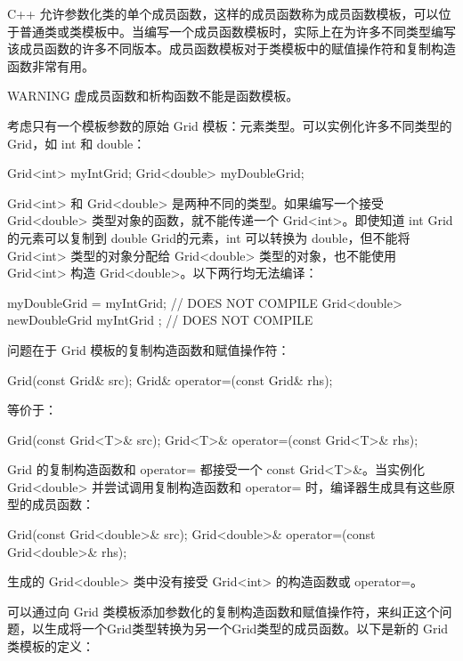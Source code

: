 
C++ 允许参数化类的单个成员函数，这样的成员函数称为成员函数模板，可以位于普通类或类模板中。当编写一个成员函数模板时，实际上在为许多不同类型编写该成员函数的许多不同版本。成员函数模板对于类模板中的赋值操作符和复制构造函数非常有用。

\begin{myWarning}{WARNING}
虚成员函数和析构函数不能是函数模板。
\end{myWarning}

考虑只有一个模板参数的原始 Grid 模板：元素类型。可以实例化许多不同类型的Grid，如 int 和 double：

\begin{cpp}
Grid<int> myIntGrid;
Grid<double> myDoubleGrid;
\end{cpp}

Grid<int> 和 Grid<double> 是两种不同的类型。如果编写一个接受 Grid<double> 类型对象的函数，就不能传递一个 Grid<int>。即使知道 int Grid的元素可以复制到 double Grid的元素，int 可以转换为 double，但不能将 Grid<int> 类型的对象分配给 Grid<double> 类型的对象，也不能使用 Grid<int> 构造 Grid<double>。以下两行均无法编译：

\begin{cpp}
myDoubleGrid = myIntGrid; // DOES NOT COMPILE
Grid<double> newDoubleGrid { myIntGrid }; // DOES NOT COMPILE
\end{cpp}

问题在于 Grid 模板的复制构造函数和赋值操作符：

\begin{cpp}
Grid(const Grid& src);
Grid& operator=(const Grid& rhs);
\end{cpp}

等价于：

\begin{cpp}
Grid(const Grid<T>& src);
Grid<T>& operator=(const Grid<T>& rhs);
\end{cpp}

Grid 的复制构造函数和 operator= 都接受一个 const Grid<T>\&。当实例化 Grid<double> 并尝试调用复制构造函数和 operator= 时，编译器生成具有这些原型的成员函数：

\begin{cpp}
Grid(const Grid<double>& src);
Grid<double>& operator=(const Grid<double>& rhs);
\end{cpp}

生成的 Grid<double> 类中没有接受 Grid<int> 的构造函数或 operator=。

可以通过向 Grid 类模板添加参数化的复制构造函数和赋值操作符，来纠正这个问题，以生成将一个Grid类型转换为另一个Grid类型的成员函数。以下是新的 Grid 类模板的定义：

